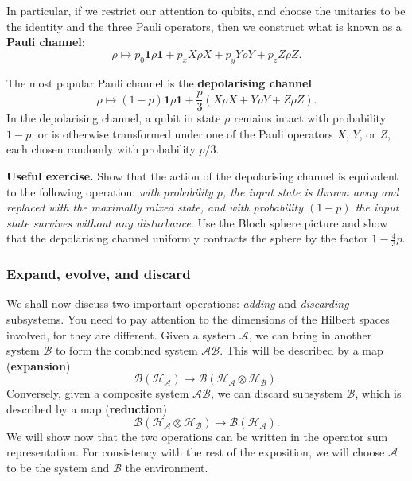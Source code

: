 \documentclass[fleqn]{article}
\begin{document}
In particular, if we restrict our attention to qubits, and choose the unitaries to be the identity and the three Pauli operators, then we construct what is known as a \textbf{Pauli channel}:
\[
  \rho
  \longmapsto p_0 \mathbf{1}\rho\mathbf{1}+ p_x X\rho X + p_y Y\rho Y + p_z Z\rho Z.
\]

The most popular Pauli channel is the \textbf{depolarising channel}
\[
  \rho
  \longmapsto (1-p) \mathbf{1}\rho\mathbf{1}+ \frac{p}{3} (X\rho X + Y\rho Y + Z\rho Z).
\]
In the depolarising channel, a qubit in state \(\rho\) remains intact with probability \(1-p\), or is otherwise transformed under one of the Pauli operators \(X\), \(Y\), or \(Z\), each chosen randomly with probability \(p/3\).

\textbf{Useful exercise.}
Show that the action of the depolarising channel is equivalent to the following operation: \emph{with probability \(p\), the input state is thrown away and replaced with the maximally mixed state, and with probability \((1-p)\) the input state survives without any disturbance}.
Use the Bloch sphere picture and show that the depolarising channel uniformly contracts the sphere by the factor \(1-\frac{4}{3}p\).

\hypertarget{expand-evolve-and-discard}{%
\subsubsection{Expand, evolve, and discard}\label{expand-evolve-and-discard}}

We shall now discuss two important operations: \emph{adding} and \emph{discarding} subsystems.
You need to pay attention to the dimensions of the Hilbert spaces involved, for they are different.
Given a system \(\mathcal{A}\), we can bring in another system \(\mathcal{B}\) to form the combined system \(\mathcal{AB}\).
This will be described by a map (\textbf{expansion})
\[
  \mathscr{B}(\mathcal{H}_{\mathcal{A}})
  \longrightarrow \mathscr{B}(\mathcal{H}_{\mathcal{A}}\otimes\mathcal{H}_{\mathcal{B}}).
\]
Conversely, given a composite system \(\mathcal{AB}\), we can discard subsystem \(\mathcal{B}\), which is described by a map (\textbf{reduction})
\[
  \mathscr{B}(\mathcal{H}_{\mathcal{A}}\otimes\mathcal{H}_{\mathcal{B}})
  \longrightarrow \mathscr{B}(\mathcal{H}_{\mathcal{A}}).
\]
We will show now that the two operations can be written in the operator sum representation.
For consistency with the rest of the exposition, we will choose \(\mathcal{A}\) to be the system and \(\mathcal{B}\) the environment.
\end{document}
